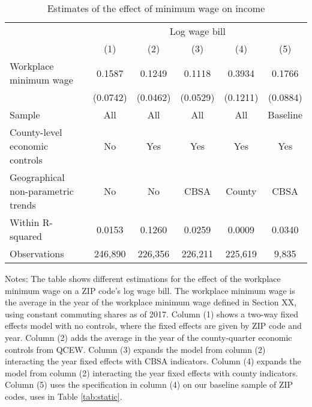 \begin{table}[]
    \caption{Estimates of the effect of minimum wage on income}
    \label{tab:static_wages}

    \begin{tabular}{@{}lccccc@{}}
        \toprule
                                        & \multicolumn{5}{c}{Log wage bill}                         \\ \cmidrule(l){2-6} 
                                        & (1)       & (2)      & (3)      & (4)      & (5)          \\ \midrule
        Workplace minimum wage             & 0.1587    & 0.1249   & 0.1118   & 0.3934      & 0.1766     \\
                                        & (0.0742)  & (0.0462) & (0.0529) & (0.1211)    & (0.0884)   \\ \midrule
        Sample                             & All       & All      & All      & All       & Baseline     \\
        County-level economic controls     & No        & Yes      & Yes      & Yes       & Yes          \\
        Geographical non-parametric trends & No        & No       & CBSA     & County     & CBSA         \\
        Within R-squared                   & 0.0153   & 0.1260   & 0.0259   & 0.0009     & 0.0340        \\
        Observations                       & 246,890   & 226,356  & 226,211  & 225,619    & 9,835       \\ \bottomrule
    \end{tabular}
    
    \begin{minipage}{.95\textwidth} \footnotesize
        \vspace{2mm}
        Notes: The table shows different estimations for the effect of the workplace minimum 
        wage on a ZIP code's log wage bill.
        The workplace minimum wage is the average in the year of the workplace minimum wage 
        defined in Section XX, using constant commuting shares as of 2017.
        Column (1) shows a two-way fixed effects model with no controls, where the fixed 
        effects are given by ZIP code and year.
        Column (2) adds the average in the year of the county-quarter economic controls from
        QCEW.
        Column (3) expands the model from column (2) interacting the year fixed effects 
        with CBSA indicators.
        Column (4) expands the model from column (2) interacting the year fixed effects 
        with county indicators.
        Column (5) uses the specification in column (4) on our baseline sample of ZIP codes,
        uses in Table \ref{tab:static}.
    \end{minipage}
\end{table}

